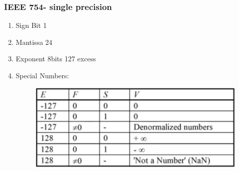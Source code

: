 \documentclass[11pt, a4paper]{article}
\begin{document}
\subsubsection{IEEE 754- single precision}
\begin{enumerate}
    \item Sign Bit 1
    \item Mantissa 24
    \item Exponent 8bits 127 excess
    \item Special Numbers:
    \begin{figure}[H]
        \centering
        \includegraphics[width=\textwidth]{Module 5/Notes/Pictures/IEEE754SinglePrecisionSpecialNumbers.png}
    \end{figure}
\end{enumerate}
\end{document}
